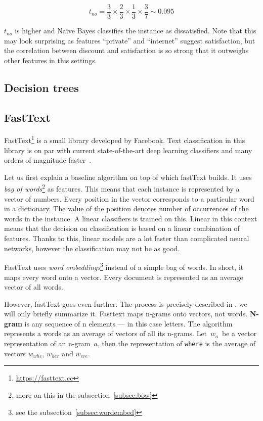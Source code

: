 \begin{equation}
	t_{no} = 
	\frac{3}{3} \times
	\frac{2}{3} \times
	\frac{1}{3} \times
	\frac{3}{7}
	\sim 0.095
\end{equation}

$t_{no}$ is higher and Na\"{i}ve Bayes classifies the instance as dissatisfied.
Note that this may look surprising as features ``private'' and ``internet'' suggest satisfaction,
but the correlation between discount and satisfaction is so strong that it outweighs other features in this settings.



\subsection{Decision trees}
\label{subsec:decisiontree}

\subsection{FastText}

FastText\footnote{\url{https://fasttext.cc}} is a small library developed by Facebook.
Text classification in this library is on par with current state-of-the-art deep learning classifiers
and many orders of magnitude faster~\citep{Joulin2017bag}.

Let us first explain a baseline algorithm on top of which fastText builds.
It uses {\it bag of words}\footnote{more on this in the subsection~\ref{subsec:bow}} as features.
This means that each instance is represented by a vector of numbers.
Every position in the vector corresponds to a particular word in a dictionary.
The value of the position denotes number of occurrences of the words in the instance.
A linear classifiers is trained on this.
Linear in this context means that the decision on classification is based on a linear combination of features.
Thanks to this, linear models are a lot faster than complicated neural networks, however the classification may not be as good.

FastText uses {\it word embeddings}\footnote{see the subsection~\ref{subsec:wordembed}} instead of a simple bag of words.
In short, it maps every word onto a vector. Every document is represented as an average vector of all words.

However, fastText goes even further.
The process is precisely described in \citet{Bojanowski2017enriching}.
we will only briefly summarize it.
Fasttext maps n-grams onto vectors, not words.
{\bf N-gram} is any sequence of n elements --- in this case letters.
The algorithm represents a words as an average of vectors of all its n-grams.
Let~$w_{a}$~be a vector representation of an n-gram~$a$, then 
the representation of \texttt{where} is the average of vectors
$w_{whe}$, 
$w_{her}$ and
$w_{ere}$.

